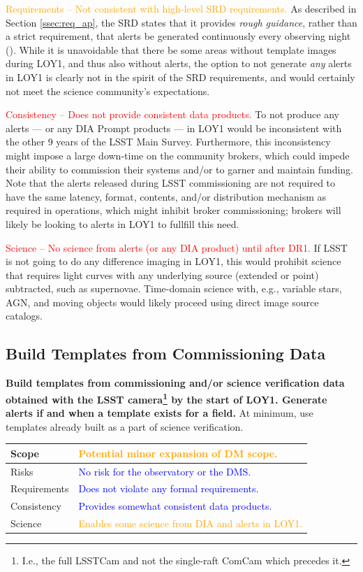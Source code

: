 \documentclass[DM,toc]{lsstdoc}
\begin{document}
\textcolor{orange}{ Requirements -- Not consistent with high-level SRD requirements.}
As described in Section \ref{ssec:req_ap}, the SRD states that it provides {\it rough guidance}, rather than a strict requirement, that alerts be generated continuously every observing night ().
While it is unavoidable that there be some areas without template images during LOY1, and thus also without alerts, the option to not generate {\it any} alerts in LOY1 is clearly not in the spirit of the SRD requirements, and would certainly not meet the science community's expectations.

\textcolor{red}{ Consistency -- Does not provide consistent data products.}
To not produce any alerts --- or any DIA Prompt products --- in LOY1 would be inconsistent with the other 9 years of the LSST Main Survey.
Furthermore, this inconsistency might impose a large down-time on the community brokers, which could impede their ability to commission their systems and/or to garner and maintain funding.
Note that the alerts released during LSST commissioning are not required to have the same latency, format, contents, and/or distribution mechanism as required in operations, which might inhibit broker commissioning;  brokers will likely be looking to alerts in LOY1 to fullfill this need.

\textcolor{red}{ Science -- No science from alerts (or any DIA product) until after DR1.}
If LSST is not going to do any difference imaging in LOY1, this would prohibit science that requires light curves with any underlying source (extended or point) subtracted, such as supernovae.
Time-domain science with, e.g., variable stars, AGN, and moving objects would likely proceed using direct image source catalogs.


\clearpage
\subsection{Build Templates from Commissioning Data}\label{ssec:potsol_comm}

{\bf Build templates from commissioning and/or science verification data obtained with the LSST camera\footnote{I.e., the full LSSTCam and not the single-raft ComCam which precedes it.} by the start of LOY1. Generate alerts if and when a template exists for a field.} At minimum, use templates already built as a part of science verification.

\begin{center}
\begin{tabular}{|p{2.5cm}|p{13cm}|}
\hline
Scope & \textcolor{orange}{Potential minor expansion of DM scope.}   \\
\hline
Risks & \textcolor{blue}{No risk for the observatory or the DMS.} \\
\hline
Requirements & \textcolor{blue}{Does not violate any formal requirements.} \\
\hline
Consistency & \textcolor{blue}{Provides somewhat consistent data products.}  \\
\hline
Science & \textcolor{orange}{Enables some science from DIA and alerts in LOY1.} \\
\hline
\end{tabular}
\end{center}
\end{document}
